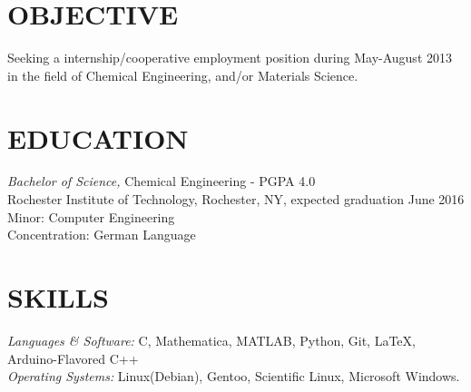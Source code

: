 \documentclass[line,margin]{res}
\begin{document}
\address{3241 Nathaniel Rochester Hall, Rochester, NY 14623}
\address{(315) 391-7268 - tmw4661@rit.edu}

\begin{resume}
 
\section{OBJECTIVE}       Seeking a internship/cooperative employment position during May-August
						  2013 in the field of Chemical Engineering, and/or
						  Materials Science.
 
\section{EDUCATION} {\sl Bachelor of Science,} Chemical Engineering - PGPA 4.0 \\
                Rochester Institute of Technology, Rochester, NY, 
                expected graduation June 2016 \\
                Minor: Computer Engineering \\
                Concentration: German Language \\
\section{SKILLS} {\sl Languages \& Software:} C, Mathematica,
						MATLAB, Python, Git, \LaTeX, Arduino-Flavored C++\\
                {\sl Operating Systems:} Linux(Debian), Gentoo, Scientific Linux, Microsoft Windows.


\end{resume}
\end{document}
